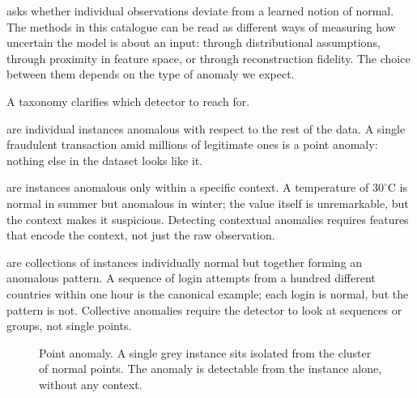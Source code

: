 \cite{Chandola2009} asks whether individual observations deviate from a learned notion of normal.
The methods in this catalogue can be read as different ways of measuring how uncertain the model is about an input: through distributional assumptions, through proximity in feature space, or through reconstruction fidelity.
The choice between them depends on the type of anomaly we expect.

\vspace{1.5em}
A taxonomy clarifies which detector to reach for.

 are individual instances anomalous with respect to the rest of the data.
A single fraudulent transaction amid millions of legitimate ones is a point anomaly: nothing else in the dataset looks like it.

 are instances anomalous only within a specific context.
A temperature of $30^{\circ}$C is normal in summer but anomalous in winter; the value itself is unremarkable, but the context makes it suspicious.
Detecting contextual anomalies requires features that encode the context, not just the raw observation.

 are collections of instances individually normal but together forming an anomalous pattern.
A sequence of login attempts from a hundred different countries within one hour is the canonical example; each login is normal, but the pattern is not.
Collective anomalies require the detector to look at sequences or groups, not single points.

\begin{figure}
\centering
{}
\caption{Point anomaly. A single grey instance sits isolated from the cluster of normal points. The anomaly is detectable from the instance alone, without any context.}
\label{fig:anomaly_point}
\end{figure}

